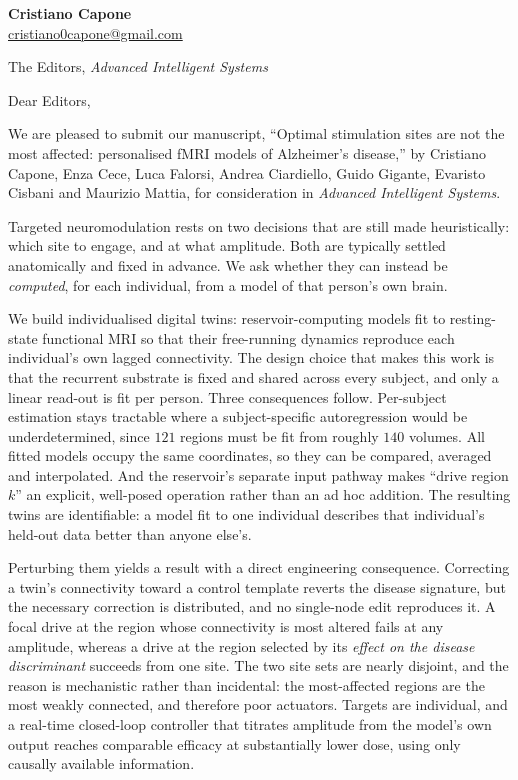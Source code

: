 \documentclass[11pt]{article}
\begin{document}
{\raggedright
\textbf{Cristiano Capone}\\
\href{mailto:cristiano0capone@gmail.com}{cristiano0capone@gmail.com}\par}

\vspace{0.6em}
{\raggedright The Editors, \textit{Advanced Intelligent Systems}\par}

\vspace{0.8em}

Dear Editors,

We are pleased to submit our manuscript, ``Optimal stimulation sites are not the
most affected: personalised fMRI models of Alzheimer's disease,'' by Cristiano
Capone, Enza Cece, Luca Falorsi, Andrea Ciardiello, Guido Gigante, Evaristo
Cisbani and Maurizio Mattia, for consideration in \textit{Advanced Intelligent
Systems}.

Targeted neuromodulation rests on two decisions that are still made
heuristically: which site to engage, and at what amplitude. Both are typically
settled anatomically and fixed in advance. We ask whether they can instead be
\emph{computed}, for each individual, from a model of that person's own brain.

We build individualised digital twins: reservoir-computing models fit to
resting-state functional MRI so that their free-running dynamics reproduce each
individual's own lagged connectivity. The design choice that makes this work is
that the recurrent substrate is fixed and shared across every subject, and only a
linear read-out is fit per person. Three consequences follow. Per-subject
estimation stays tractable where a subject-specific autoregression would be
underdetermined, since $121$ regions must be fit from roughly $140$ volumes. All
fitted models occupy the same coordinates, so they can be compared, averaged and
interpolated. And the reservoir's separate input pathway makes ``drive region
$k$'' an explicit, well-posed operation rather than an ad hoc addition. The
resulting twins are identifiable: a model fit to one individual describes that
individual's held-out data better than anyone else's.

Perturbing them yields a result with a direct engineering consequence. Correcting
a twin's connectivity toward a control template reverts the disease signature,
but the necessary correction is distributed, and no single-node edit reproduces
it. A focal drive at the region whose connectivity is most altered fails at any
amplitude, whereas a drive at the region selected by its \emph{effect on the
disease discriminant} succeeds from one site. The two site sets are nearly
disjoint, and the reason is mechanistic rather than incidental: the most-affected
regions are the most weakly connected, and therefore poor actuators. Targets are
individual, and a real-time closed-loop controller that titrates amplitude from
the model's own output reaches comparable efficacy at substantially lower dose,
using only causally available information.
\end{document}
